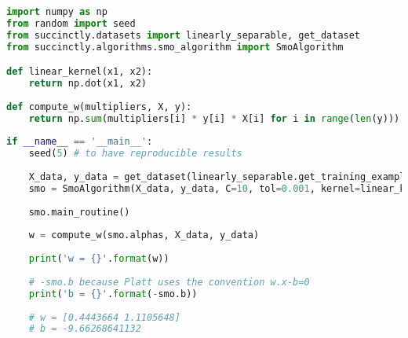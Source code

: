 \begin{lstlisting}[language=python]
import numpy as np 
from random import seed 
from succinctly.datasets import linearly_separable, get_dataset 
from succinctly.algorithms.smo_algorithm import SmoAlgorithm 

def linear_kernel(x1, x2): 
    return np.dot(x1, x2) 
    
def compute_w(multipliers, X, y): 
    return np.sum(multipliers[i] * y[i] * X[i] for i in range(len(y))) 
    
if __name__ == '__main__': 
    seed(5) # to have reproducible results 
    
    X_data, y_data = get_dataset(linearly_separable.get_training_examples) 
    smo = SmoAlgorithm(X_data, y_data, C=10, tol=0.001, kernel=linear_kernel, use_linear_optim=True) 
    
    smo.main_routine() 
    
    w = compute_w(smo.alphas, X_data, y_data)
    
    print('w = {}'.format(w)) 
    
    # -smo.b because Platt uses the convention w.x-b=0 
    print('b = {}'.format(-smo.b)) 
    
    # w = [0.4443664 1.1105648] 
    # b = -9.66268641132
\end{lstlisting}